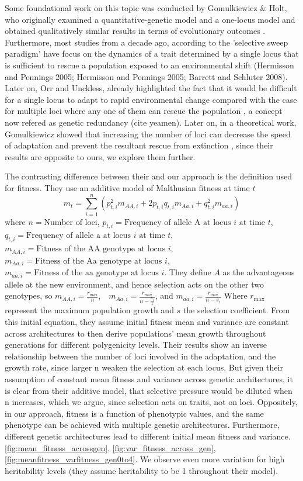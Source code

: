 \documentclass{article}
\begin{document}
Some foundational work on this topic was conducted by Gomulkiewicz \& Holt, who originally examined a quantitative-genetic model and a one-locus model  and obtained qualitatively similar results in terms of evolutionary outcomes \citep{Gomulkiewicz1995-sj}.  Furthermore, most studies from a decade ago, according to the 'selective sweep paradigm'  have focus on the dynamics of a trait determined by a single locus that is sufficient to rescue a population exposed to an environmental shift (Hermisson and Pennings 2005;  Hermisson and Pennings 2005; Barrett and Schluter 2008). Later on, Orr and Unckless, already highlighted the fact that it would be difficult for a single locus to adapt to rapid environmental change compared with the case for multiple loci where any one of them can rescue the population \citep{Orr2014-yn}, a concept now refered as genetic redundancy (cite yeamen). Later on,  in a theoretical work, Gomulkiewicz showed that increasing the number of loci can decrease the speed of adaptation and prevent the resultant rescue from extinction \citep{Gomulkiewicz2010-wr}, since their results are opposite to ours, we explore them further. 

The contrasting difference between their and our approach is the definition used for fitness. They use an additive model of Malthusian fitness at time $t$ 
\[
m_t = \sum_{i=1}^{n} \left( p_{t,i}^2 m_{AA,i} + 2p_{t,i} q_{t,i} m_{Aa,i} + q_{t,i}^2 m_{aa,i} \right)
\]
where  
$n = \text{Number of loci}$, $p_{t,i} = \text{Frequency of allele A at locus } i \text{ at time } t$, 
$q_{t,i} = \text{Frequency of allele a at locus } i \text{ at time } t$, $m_{AA,i} = \text{Fitness of the AA genotype at locus } i$,
$m_{Aa,i} = \text{Fitness of the Aa genotype at locus } i$,
$m_{aa,i} = \text{Fitness of the aa genotype at locus } i $. They define $A$ as the advantageous allele at the new environment, and hence selection acts on the other two genotypes, so $m_{AA,i} = \frac{r_{\text{max}}}{n}$, $\text{ } m_{Aa,i} = \frac{r_{\text{max}}}{n - \frac{s_i}{2}} $, and $m_{aa,i} = \frac{r_{\text{max}}}{n - s_i} $
Where $r_{\text{max}}$ represent the maximum population growth and $s$ the selection coefficient. 
From this initial equation, they assume initial fitness mean and variance are constant across architectures to then derive populations' mean growth throughout generations for different polygenicity levels. Their results show an inverse relationship between the number of loci involved in the adaptation, and the growth rate, since larger n weaken the selection at each locus. But given their assumption of constant mean fitness and variance across genetic architectures, it is clear from their additive model, that selective pressure would be diluted when n increases, which we argue, since selection acts on traits, not on loci. Oppositely, in our approach, fitness is a function of phenotypic values, and the same phenotype can be achieved with multiple genetic architectures. Furthermore, different genetic architectures lead to different initial mean fitness and variance.  \ref{fig:mean_fitness_acrossgen}, \ref{fig:var_fitness_across_gen},  \ref{fig:meanfitness_varfitness_gen0to4}. We observe even more variation for high heritability levels (they assume heritability to be 1 throughout their model). 
\end{document}
